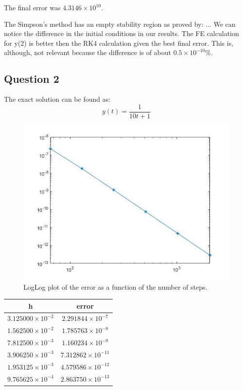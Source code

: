 \documentclass[a4paper, 11pt]{article}
\begin{document}
		The final error was $4.3146 \times 10^{10}$.
		
		The Simpson's method has an empty stability region as proved by: $\ldots$
		We can notice the difference in the initial conditions in our results.
		The FE calculation for y(2) is better then the RK4 calculation given the best final error.
		This is, although, not relevant because the difference is of about $ 0.5 \times 10^{-10} \% $.
		
		\subsection*{Question 2}
		
		The exact solution can be found as:
		\begin{equation}
			y(t) = \frac{1}{10t + 1}
		\end{equation}
		
		\begin{figure}[H]
			\centering
			\includegraphics[width=\linewidth]{ex2.jpg}
			\caption{LogLog plot of the error as a function of the number of steps.}
			\label{fig:ex2}
		\end{figure}
		
		\begin{table}[H]
			\centering
			\begin{tabular}{c|c}
				\textbf{h}& \textbf{error}   \\ \hline
				$ 3.125000\times 10^{-2} $ & $ 2.291844\times 10^{-7} $ \\ \hline
				$ 1.562500\times 10^{-2} $ & $ 1.785763\times 10^{-8} $ \\ \hline
				$ 7.812500\times 10^{-3} $ & $ 1.160234\times 10^{-9} $ \\ \hline
				$ 3.906250\times 10^{-3} $ & $ 7.312862\times 10^{-11} $ \\ \hline
				$ 1.953125\times 10^{-3} $ & $ 4.579586\times 10^{-12} $ \\ \hline
				$ 9.765625\times 10^{-4} $ & $ 2.863750\times 10^{-13} $ \\ \hline
			\end{tabular}
		\end{table}
		
\end{document}
